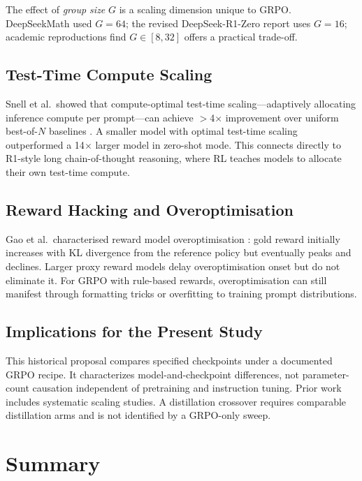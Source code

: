 \documentclass[12pt,a4paper]{report}
\begin{document}
The effect of \emph{group size} $G$ is a scaling dimension unique to GRPO. DeepSeekMath used $G = 64$; the revised DeepSeek-R1-Zero report uses $G = 16$; academic reproductions find $G \in [8, 32]$ offers a practical trade-off.

\subsection{Test-Time Compute Scaling}

Snell et al.\ showed that compute-optimal test-time scaling---adaptively allocating inference compute per prompt---can achieve $>$4$\times$ improvement over uniform best-of-$N$ baselines \cite{snell2024scaling}. A smaller model with optimal test-time scaling outperformed a 14$\times$ larger model in zero-shot mode. This connects directly to R1-style long chain-of-thought reasoning, where RL teaches models to allocate their own test-time compute.

\subsection{Reward Hacking and Overoptimisation}

Gao et al.\ characterised reward model overoptimisation \cite{gao2023scaling}: gold reward initially increases with KL divergence from the reference policy but eventually peaks and declines. Larger proxy reward models delay overoptimisation onset but do not eliminate it. For GRPO with rule-based rewards, overoptimisation can still manifest through formatting tricks or overfitting to training prompt distributions.

\subsection{Implications for the Present Study}

This historical proposal compares specified checkpoints under a documented GRPO recipe. It characterizes model-and-checkpoint differences, not parameter-count causation independent of pretraining and instruction tuning. Prior work includes systematic scaling studies. A distillation crossover requires comparable distillation arms and is not identified by a GRPO-only sweep.


\section{Summary}
\label{sec:lit-summary}
\end{document}
